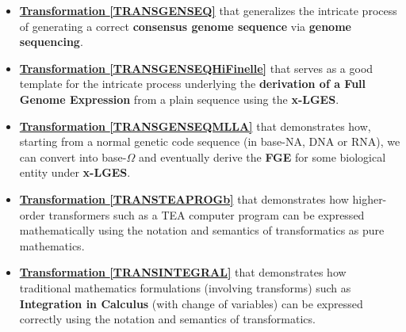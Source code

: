 \documentclass[a4paper, 18pt]{book} %
\begin{document}
\begin{enumerate}
{	\begin{itemize}
	\item \textbf{\hyperref[TRANSGENSEQ]{Transformation \ref{TRANSGENSEQ}}} that generalizes the intricate process of generating a correct \textbf{consensus genome sequence} via \textbf{genome sequencing}.
	\item \textbf{\hyperref[TRANSGENSEQHiFinelle]{Transformation \ref{TRANSGENSEQHiFinelle}}} that serves as a good template for the intricate process underlying the \textbf{derivation of a Full Genome Expression} from a plain sequence using the \textbf{x-LGES}.
		\item \textbf{\hyperref[TRANSGENSEQMLLA]{Transformation \ref{TRANSGENSEQMLLA}}} that demonstrates how, starting from a normal genetic code sequence (in base-NA, DNA or RNA), we can convert into base-$\Omega$ and eventually derive the \textbf{FGE} for some biological entity under \textbf{x-LGES}.
		\item \textbf{\hyperref[TRANSTEAPROGb]{Transformation \ref{TRANSTEAPROGb}}} that demonstrates how higher-order transformers such as a TEA computer program can be expressed mathematically using the notation and semantics of transformatics as pure mathematics.
		\item \textbf{\hyperref[TRANSINTEGRAL]{Transformation \ref{TRANSINTEGRAL}}} that demonstrates how traditional mathematics formulations (involving transforms) such as \textbf{Integration in Calculus}  (with change of variables) can be expressed correctly using the notation and semantics of transformatics.
	\end{itemize}

}
\end{enumerate}
\end{document}
